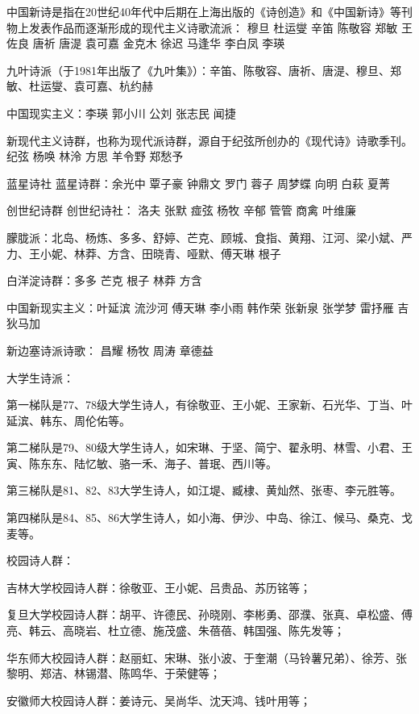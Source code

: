 \documentclass[UTF8]{../RepresentationUniverse}
\begin{document}
中国新诗是指在20世纪40年代中后期在上海出版的《诗创造》和《中国新诗》等刊物上发表作品而逐渐形成的现代主义诗歌流派： 穆旦 杜运燮 辛笛 陈敬容 郑敏 王佐良 唐祈 唐湜 袁可嘉 金克木 徐迟 马逢华 李白凤 李瑛



九叶诗派（于1981年出版了《九叶集》）：辛笛、陈敬容、唐祈、唐湜、穆旦、郑敏、杜运燮、袁可嘉、杭约赫



中国现实主义：李瑛 郭小川 公刘 张志民 闻捷


新现代主义诗群，也称为现代派诗群，源自于纪弦所创办的《现代诗》诗歌季刊。纪弦 杨唤 林泠 方思 羊令野 郑愁予



蓝星诗社 蓝星诗群：余光中 覃子豪 钟鼎文 罗门 蓉子 周梦蝶 向明 白萩 夏菁


创世纪诗群 创世纪诗社： 洛夫 张默 痖弦 杨牧 辛郁 管管 商禽 叶维廉




朦胧派：北岛、杨炼、多多、舒婷、芒克、顾城、食指、黄翔、江河、梁小斌、严力、王小妮、林莽、方含、田晓青、哑默、傅天琳 根子 


白洋淀诗群：多多 芒克 根子 林莽 方含


中国新现实主义：叶延滨 流沙河 傅天琳 李小雨 韩作荣 张新泉 张学梦 雷抒雁 吉狄马加


新边塞诗派诗歌： 昌耀 杨牧 周涛 章德益




大学生诗派：

第一梯队是77、78级大学生诗人，有徐敬亚、王小妮、王家新、石光华、丁当、叶延滨、韩东、周伦佑等。

第二梯队是79、80级大学生诗人，如宋琳、于坚、简宁、翟永明、林雪、小君、王寅、陈东东、陆忆敏、骆一禾、海子、普珉、西川等。

第三梯队是81、82、83大学生诗人，如江堤、臧棣、黄灿然、张枣、李元胜等。

第四梯队是84、85、86大学生诗人，如小海、伊沙、中岛、徐江、候马、桑克、戈麦等。

校园诗人群：

吉林大学校园诗人群：徐敬亚、王小妮、吕贵品、苏历铭等；

复旦大学校园诗人群：胡平、许德民、孙晓刚、李彬勇、邵濮、张真、卓松盛、傅亮、韩云、高晓岩、杜立德、施茂盛、朱蓓蓓、韩国强、陈先发等；

华东师大校园诗人群：赵丽虹、宋琳、张小波、于奎潮（马铃薯兄弟）、徐芳、张黎明、郑洁、林锡潜、陈鸣华、于荣健等；

安徽师大校园诗人群：姜诗元、吴尚华、沈天鸿、钱叶用等；
\end{document}
